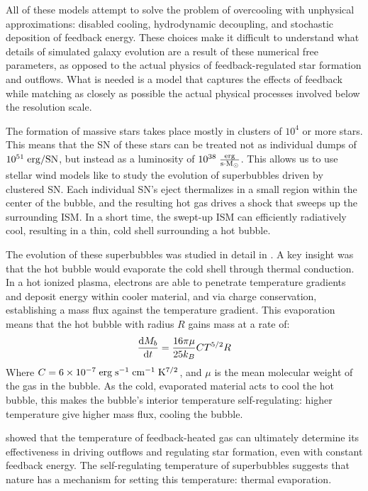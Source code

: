 All of these models attempt to solve the problem of overcooling with unphysical
approximations: disabled cooling, hydrodynamic decoupling, and stochastic
deposition of feedback energy.  These choices make it difficult to understand
what details of simulated galaxy evolution are a result of these numerical free
parameters, as opposed to the actual physics of feedback-regulated star
formation and outflows.  What is needed is a model that captures the effects of
feedback while matching as closely as possible the actual physical processes
involved below the resolution scale.

The formation of massive stars takes place mostly in clusters of $10^4$ or more
stars.  This means that the SN of these stars can be treated not as
individual dumps of $10^{51}\;\rm{erg/SN}$, but instead as a luminosity of
$10^{38}\;\rm{\frac{erg}{s \cdot M_\odot}}$.  This allows us to use stellar wind
models like \citet{Weaver1977} to study the evolution of superbubbles driven by
clustered SN.  Each individual SN's eject thermalizes in a small
region within the center of the bubble, and the resulting hot gas drives a shock
that sweeps up the surrounding ISM.  In a short time, the swept-up ISM can
efficiently radiatively cool, resulting in a thin, cold shell surrounding a hot
bubble.

The evolution of these superbubbles was studied in detail in \citet{MacLow1988}.
A key insight was that the hot bubble would evaporate the cold shell through
thermal conduction.  In a hot ionized plasma, electrons are able to penetrate
temperature gradients and deposit energy within cooler material, and via charge
conservation, establishing a mass flux against the temperature gradient.  This
evaporation means that the hot bubble with radius $R$ gains mass at a rate of:
\begin{equation}
    \frac{{\rm d }M_b}{{\rm d}t} = \frac{16\pi\mu}{25k_B} CT^{5/2}R
\end{equation}
Where $C=6\times10^{-7}\;\rm{erg\;s^{-1}\;cm^{-1}\;K^{7/2}}$, and $\mu$ is the
mean molecular weight of the gas in the bubble.  As the cold, evaporated
material acts to cool the hot bubble, this makes the bubble's interior
temperature self-regulating: higher temperature give higher mass flux, cooling
the bubble.

\citet{DallaVecchia2012} showed that the temperature of feedback-heated gas can
ultimately determine its effectiveness in driving outflows and regulating star
formation, even with constant feedback energy.  The self-regulating temperature
of superbubbles suggests that nature has a mechanism for setting
this temperature: thermal evaporation.

